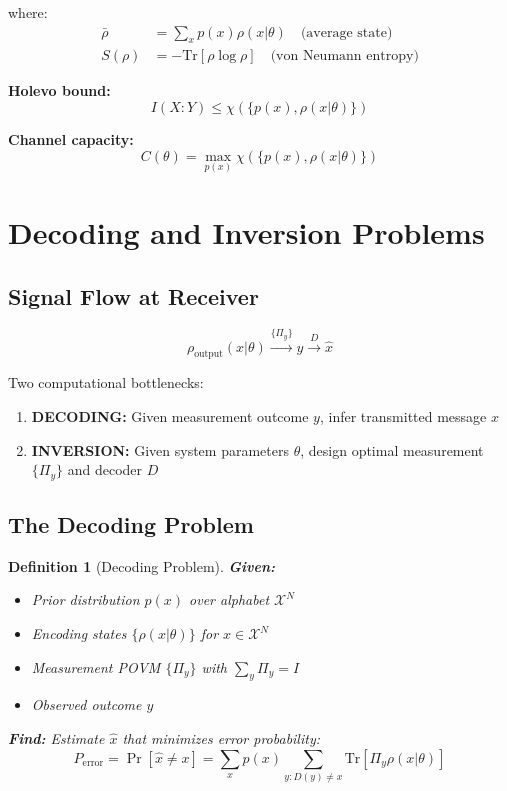 \documentclass[12pt,a4paper]{article}
\newtheorem{definition}{Definition}[section]
\begin{document}
where:
\begin{align}
\bar{\rho} &= \sum_x p(x)\rho(x|\theta) \quad \text{(average state)} \\
S(\rho) &= -\text{Tr}[\rho\log\rho] \quad \text{(von Neumann entropy)}
\end{align}

\textbf{Holevo bound:}
\begin{equation}
I(X:Y) \leq \chi(\{p(x), \rho(x|\theta)\})
\end{equation}

\textbf{Channel capacity:}
\begin{equation}
C(\theta) = \max_{p(x)} \chi(\{p(x), \rho(x|\theta)\})
\end{equation}

\section{Decoding and Inversion Problems}

\subsection{Signal Flow at Receiver}

\begin{equation}
\rho_{\text{output}}(x|\theta) \xrightarrow{\{\Pi_y\}} y \xrightarrow{D} \hat{x}
\end{equation}

Two computational bottlenecks:
\begin{enumerate}
\item \textbf{DECODING:} Given measurement outcome $y$, infer transmitted message $x$
\item \textbf{INVERSION:} Given system parameters $\theta$, design optimal measurement $\{\Pi_y\}$ and decoder $D$
\end{enumerate}

\subsection{The Decoding Problem}

\begin{definition}[Decoding Problem]
\textbf{Given:}
\begin{itemize}
\item Prior distribution $p(x)$ over alphabet $\mathcal{X}^N$
\item Encoding states $\{\rho(x|\theta)\}$ for $x \in \mathcal{X}^N$
\item Measurement POVM $\{\Pi_y\}$ with $\sum_y \Pi_y = I$
\item Observed outcome $y$
\end{itemize}

\textbf{Find:} Estimate $\hat{x}$ that minimizes error probability:
\begin{equation}
P_{\text{error}} = \Pr[\hat{x} \neq x] = \sum_x p(x)\sum_{y:D(y)\neq x} \text{Tr}[\Pi_y\rho(x|\theta)]
\end{equation}
\end{definition}
\end{document}
